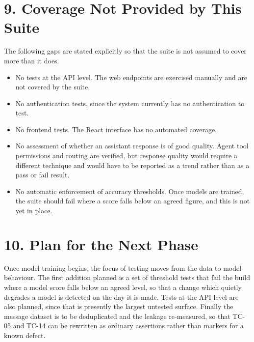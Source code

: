 \documentclass[11pt,a4paper]{article}
\begin{document}
\section{9. Coverage Not Provided by This Suite}
The following gaps are stated explicitly so that the suite is not assumed to cover more than it does.

\begin{itemize}[leftmargin=*,itemsep=2pt]
  \item No tests at the API level. The web endpoints are exercised manually and are not covered by the suite.
  \item No authentication tests, since the system currently has no authentication to test.
  \item No frontend tests. The React interface has no automated coverage.
  \item No assessment of whether an assistant response is of good quality. Agent tool permissions and routing are verified, but response quality would require a different technique and would have to be reported as a trend rather than as a pass or fail result.
  \item No automatic enforcement of accuracy thresholds. Once models are trained, the suite should fail where a score falls below an agreed figure, and this is not yet in place.
\end{itemize}

\section{10. Plan for the Next Phase}
Once model training begins, the focus of testing moves from the data to model behaviour. The first addition planned is a set of threshold tests that fail the build where a model score falls below an agreed level, so that a change which quietly degrades a model is detected on the day it is made. Tests at the API level are also planned, since that is presently the largest untested surface. Finally the message dataset is to be deduplicated and the leakage re-measured, so that TC-05 and TC-14 can be rewritten as ordinary assertions rather than markers for a known defect.
\end{document}
